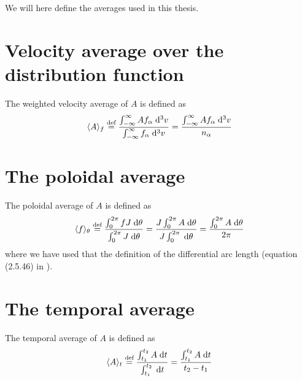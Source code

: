 %
We will here define the averages used in this thesis.
%
\section{Velocity average over the distribution function}
%
The weighted velocity average of $A$ is defined as
%
\begin{align}
    \langle{A}\rangle_{f} \overset{\text{def}}{=}
        \frac{
            \int_{-\infty}^{\infty} {Af_\alpha} \; \text{d} {^3v}
        }{
            \int_{-\infty}^{\infty} {f_\alpha} \; \text{d} {^3v}
        }
    =
        \frac{\int_{-\infty}^{\infty} {Af_\alpha} \; \text{d} {^3v}}{n_\alpha}
    \label{app:distAvg}
\end{align}


\section{The poloidal average}
\label{sec:polAvg}
%
The poloidal average of $A$ is defined as
%
\begin{align*}
    \langle{f}\rangle_\theta \overset{\text{def}}{=}
        \frac{
            \int_{0}^{2\pi} {fJ} \; \text{d} {\theta}
        }{
            \int_{0}^{2\pi} {J} \; \text{d} {\theta}
        }
    =
        \frac{
            J\int_{0}^{2\pi} {A} \; \text{d} {\theta}
        }{
            J\int_{0}^{2\pi} {} \; \text{d} {\theta}
        }
    =
        \frac{\int_{0}^{2\pi} {A} \; \text{d} {\theta}}{2\pi}
\end{align*}
%
where we have used that the definition of the differential arc length (equation (2.5.46) in \cite{Dhaeseleer1991book}).

\section{The temporal average}
%
The temporal average of $A$ is defined as
%
\begin{align*}
    \langle{A}\rangle_t \overset{\text{def}}{=}
        \frac{
            \int_{t_1}^{t_2} {A} \; \text{d} {t}
        }{
            \int_{t_1}^{t_2} {} \; \text{d} {t}
        }
    =
        \frac{\int_{t_1}^{t_2} {A} \; \text{d} {t}}{t_2-t_1}
\end{align*}
